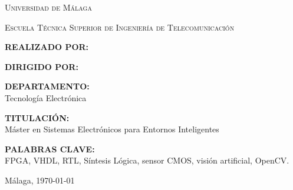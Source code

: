 \cleardoublepage

\begin{titlepage}
    \begin{center}
        {\large\scshape Universidad de Málaga \par}
        \vspace{0.2cm}
        {\normalsize\scshape Escuela Técnica Superior de Ingeniería de Telecomunicación \par}        
        \vspace{1.5cm}
        
        {\Large\bfseries \myTitle \par}
        
        \vspace{1.5cm}
    \end{center}
    
    \noindent\textbf{REALIZADO POR:}\\
    \myName
    
    \vspace{0.8cm}
    
    \noindent\textbf{DIRIGIDO POR:}\\
    \mySupervisor
    
    \vspace{0.8cm}
    
    \noindent\textbf{DEPARTAMENTO:}\\
    Tecnolog{\'i}a Electr{\'o}nica
    
    \vspace{0.8cm}
    
    \noindent\textbf{TITULACI{\'O}N:}\\
    M{\'a}ster en Sistemas Electr{\'o}nicos para Entornos Inteligentes
    
    \vspace{0.8cm}
    
    \noindent\textbf{PALABRAS CLAVE:}\\
    FPGA, VHDL, RTL, Síntesis Lógica, sensor CMOS, visión artificial, OpenCV.
    
    \vspace{0.8cm}
    
    
    \vfill
    
    \begin{flushright}
        M{\'a}laga, \today
    \end{flushright}
\end{titlepage}